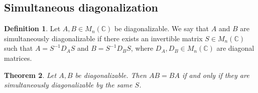 \documentclass[12pt]{article}
\newtheorem{thm}{Theorem}[section]
\theoremstyle{definition}
\newtheorem{defn}[thm]{Definition}
\theoremstyle{remark}
\begin{document}
\subsection{Simultaneous diagonalization}

\begin{defn}
  Let $A, B \in M_n(\mathbb{C})$ be diagonalizable. We say that $A$
  and $B$ are simultaneously diagonalizable if there exists an
  invertible matrix $S \in M_n(\mathbb{C})$ such that $A =
  S^{-1}D_AS$ and $B = S^{-1}D_BS$, where $D_A, D_B \in
  M_n(\mathbb{C})$ are diagonal matrices.
\end{defn}

\begin{thm}
  Let $A, B$ be diagonalizable. Then $AB = BA$ if and only if they
  are simultaneously diagonalizable by the same $S$.
\end{thm}
\end{document}
